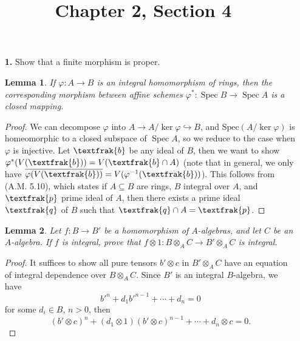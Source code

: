 \documentclass{article}
\title{Chapter 2, Section 4}
\newcommand{\goth}[1]{\textfrak{#1}}
\DeclareMathOperator{\spec}{Spec}
\newtheorem{lemma}{Lemma}
\begin{document}
\maketitle
\begin{enumerate} [label=\textbf{\arabic*.}, leftmargin=0em]

\item[\textbf{1.}] Show that a finite morphism is proper.

\begin{lemma}
    If $\varphi : A \to B$ is an integral homomorphism of rings, then the corresponding morphism between affine schemes $\varphi^* : \spec{B} \to \spec{A}$ is a closed mapping. 
\end{lemma}

\begin{proof}
    We can decompose $\varphi$ into $A \to A / \ker{\varphi} \hookrightarrow B$, and $\text{Spec}(A / \ker{\varphi})$ is homeomorphic to a closed subspace of $\spec{A}$, so we reduce to the case when $\varphi$ is injective. Let $\goth{b}$ be any ideal of $B$, then we want to show $\varphi^*(V(\goth{b})) = V(\goth{b} \cap A)$ (note that in general, we only have $\overline{\varphi(V(\goth{b}))} = V(\varphi^{-1}(\goth{b}))$). This follows from (A.M. 5.10), which states if $A \subseteq B$ are rings, $B$ integral over $A$, and $\goth{p}$ prime ideal of $A$, then there exists a prime ideal $\goth{q}$ of $B$ such that $\goth{q} \cap A = \goth{p}$.
\end{proof}

\begin{lemma}
    Let $f : B \to B'$ be a homomorphism of $A$-algebras, and let $C$ be an $A$-algebra. If $f$ is integral, prove that $f \otimes 1 : B \otimes_A C \to B' \otimes_A C$ is integral.
\end{lemma}

\begin{proof}
    It suffices to show all pure tensors $b'\otimes c$ in $B'\otimes_A C$ have an equation of integral dependence over $B\otimes_A C$. Since $B'$ is an integral $B$-algebra, we have $$b'^n + d_1 b'^{n - 1} + \cdots + d_n = 0$$ for some $d_i \in B$, $n > 0$, then 
    \begin{equation*}
        (b' \otimes c)^n + (d_1 \otimes 1)(b' \otimes c)^{n - 1} + \cdots + d_n \otimes c = 0.
    \end{equation*}
\end{proof}


\end{enumerate}
\end{document}

